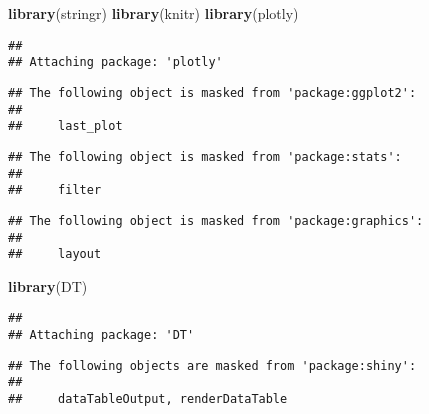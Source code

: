 \documentclass[
]{article}
\newenvironment{Shaded}{\begin{snugshade}}{\end{snugshade}}
\newcommand{\FunctionTok}[1]{\textcolor[rgb]{0.13,0.29,0.53}{\textbf{#1}}}
\newcommand{\NormalTok}[1]{#1}
\begin{document}
\begin{Shaded}
\begin{Highlighting}[]
\FunctionTok{library}\NormalTok{(stringr)}
\FunctionTok{library}\NormalTok{(knitr)}
\FunctionTok{library}\NormalTok{(plotly)}
\end{Highlighting}
\end{Shaded}

\begin{verbatim}
## 
## Attaching package: 'plotly'
\end{verbatim}

\begin{verbatim}
## The following object is masked from 'package:ggplot2':
## 
##     last_plot
\end{verbatim}

\begin{verbatim}
## The following object is masked from 'package:stats':
## 
##     filter
\end{verbatim}

\begin{verbatim}
## The following object is masked from 'package:graphics':
## 
##     layout
\end{verbatim}

\begin{Shaded}
\begin{Highlighting}[]
\FunctionTok{library}\NormalTok{(DT)}
\end{Highlighting}
\end{Shaded}

\begin{verbatim}
## 
## Attaching package: 'DT'
\end{verbatim}

\begin{verbatim}
## The following objects are masked from 'package:shiny':
## 
##     dataTableOutput, renderDataTable
\end{verbatim}
\end{document}
